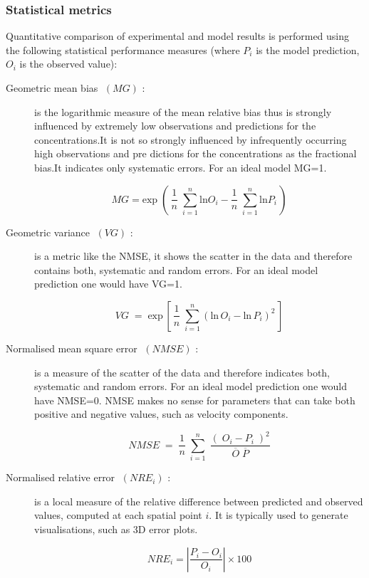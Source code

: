 \subsubsection{Statistical metrics \label{sec:statistical_metrics}}
Quantitative comparison of experimental and model results is performed using the following statistical performance measures (where $P_i$ is the model prediction, $O_i$ is the observed value):
\begin{description}

    \item[Geometric mean bias $\;\left( MG \right)$ :] is the logarithmic measure of the mean relative bias thus is strongly influenced by extremely low observations and predictions for the concentrations.It is not so strongly influenced by infrequently occurring high observations and pre dictions for the concentrations as the fractional bias.It indicates only systematic errors. For an ideal model MG=1. 

    \begin{equation*}
        MG = \mbox{exp}\;(\,\frac{1}{n}\;\sum_{i=1}^n\mbox{ln} O_i - \frac{1}{n}\;\sum_{i=1}^n\mbox{ln} P_i\,)
    \end{equation*}

    \item[Geometric variance $\;\left( VG \right)$ :] is a metric like the NMSE, it shows the scatter in the data and therefore contains both, systematic and random errors. For an ideal model prediction one would have VG=1.

    \begin{equation*}
        VG\;=\;\mbox{exp}\,\left[\,\frac{1}{n}\;\sum_{i=1}^n(\mbox{ln}\,O_i - \mbox{ln}\,P_i)^2\,\right]
    \end{equation*}

    \item[Normalised mean square error $\;\left( NMSE \right)$ :] is a measure of the scatter of the data and therefore indicates both, systematic and random errors. For an ideal model prediction one would have NMSE=0. NMSE makes no sense for parameters that can take both positive and negative values, such as velocity components.

    \begin{equation*}
        NMSE\;=\;\frac{1}{n}\;\sum_{i=1}^n\;\frac{(\;O_i - P_i\;)^2}{\overline{O}\;\overline{P}}
    \end{equation*}

    \item[Normalised relative error $\;\left( NRE_i \right)$ :] is a local measure of the relative difference between predicted and observed values, computed at each spatial point $i$. It is typically used to generate visualisations, such as 3D error plots.

\begin{equation*}
    NRE_i = \left| \frac{P_i - O_i}{O_i} \right| \times 100
\end{equation*}

\end{description}

